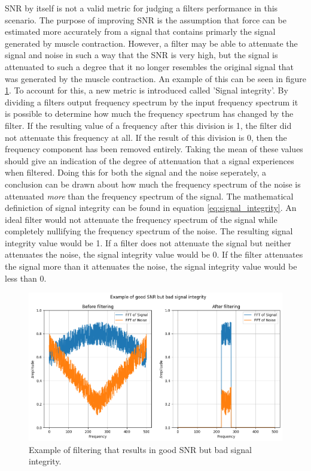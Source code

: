 SNR by itself is not a valid metric for judging a filters performance in this scenario. The purpose of improving SNR is the assumption that force can be estimated more accurately from a signal that contains primarly the signal generated by muscle contraction. However, a filter may be able to attenuate the signal and noise in such a way that the SNR is very high, but the signal is attenuated to such a degree that it no longer resembles the original signal that was generated by the muscle contraction. An example of this can be seen in figure \ref{fig:good_snr_bad_integrity}. To account for this, a new metric is introduced called 'Signal integrity'. By dividing a filters output frequency spectrum by the input frequency spectrum it is possible to determine how much the frequency spectrum has changed by the filter. If the resulting value of a frequency after this division is 1, the filter did not attenuate this frequency at all. If the result of this division is 0, then the frequency component has been removed entirely. Taking the mean of these values should give an indication of the degree of attenuation that a signal experiences when filtered. Doing this for both the signal and the noise seperately, a conclusion can be drawn about how much the frequency spectrum of the noise is attenuated \textit{more} than the frequency spectrum of the signal. The mathematical definiction of signal integrity can be found in equation \ref{eq:signal_integrity}. An ideal filter would not attenuate the frequency spectrum of the signal while completely nullifying the frequency spectrum of the noise. The resulting signal integrity value would be 1. If a filter does not attenuate the signal but neither attenuates the noise, the signal integrity value would be 0. If the filter attenuates the signal more than it attenuates the noise, the signal integrity value would be less than 0.

\begin{figure}[h!t]
	\begin{center}
		\includegraphics[width=1.0\columnwidth]{images/good_snr_bad_integrity.png}
	\end{center}
	\caption{Example of filtering that results in good SNR but bad signal integrity.}
	\label{fig:good_snr_bad_integrity}
\end{figure}

